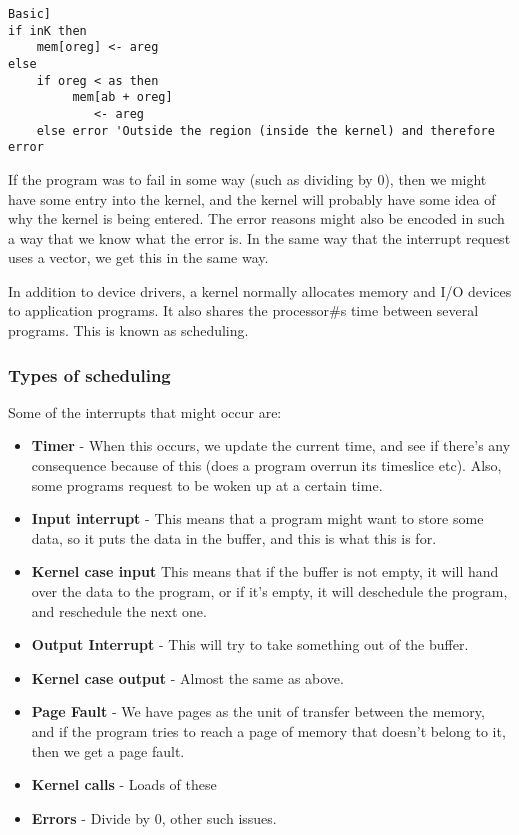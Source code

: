 \documentclass[11pt,a4paper,titlepage,dvipsnames,cmyk]{scrartcl}
\begin{document}
\begin{lstlisting}[language=[Visual]Basic]
if inK then
    mem[oreg] <- areg
else
    if oreg < as then
         mem[ab + oreg]
            <- areg
    else error 'Outside the region (inside the kernel) and therefore error
\end{lstlisting}

If the program was to fail in some way (such as dividing by 0), then we
might have some entry into the kernel, and the kernel will probably have
some idea of why the kernel is being entered. The error reasons might also
be encoded in such a way that we know what the error is. In the same way
that the interrupt request uses a vector, we get this in the same way.

In addition to device drivers, a kernel normally allocates memory and
I/O devices to application programs. It also shares the processor#s time
between several programs. This is known as scheduling.

\subsubsection{Types of scheduling}%
\label{ssub:types}

Some of the interrupts that might occur are:
\begin{itemize}
    \item \textbf{Timer} - When this occurs, we update the current time,
        and see if there's any consequence because of this (does a program
        overrun its timeslice etc). Also, some programs request to be
        woken up at a certain time.
    \item \textbf{Input interrupt} - This means that a program might want
        to store some data, so it puts the data in the buffer, and this is
        what this is for.
    \item \textbf{Kernel case input} This means that if the buffer is not
        empty, it will hand over the data to the program, or if it's
        empty, it will deschedule the program, and reschedule the next
        one.
    \item \textbf{Output Interrupt} - This will try to take something out
        of the buffer.
    \item \textbf{Kernel case output} - Almost the same as above.
    \item \textbf{Page Fault} - We have pages as the unit of transfer
        between the memory, and if the program tries to reach a page of
        memory that doesn't belong to it, then we get a page fault.
    \item \textbf{Kernel calls} - Loads of these
    \item \textbf{Errors} - Divide by 0, other such issues.
\end{itemize}
\end{document}
